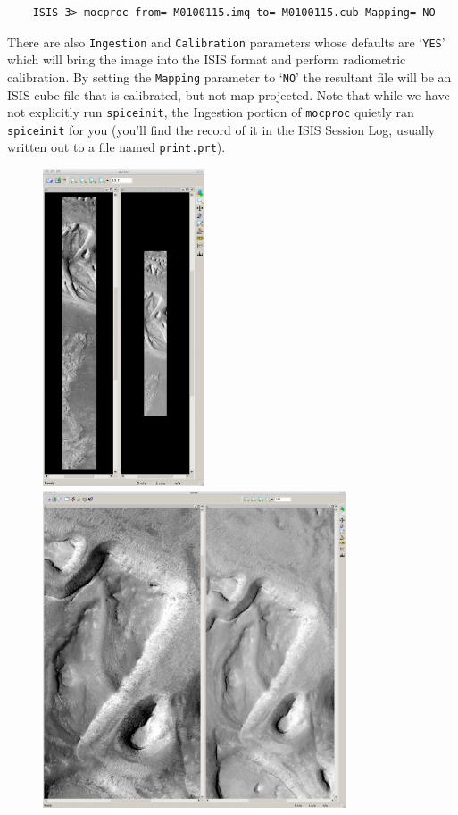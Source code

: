 \begin{verbatim}
    ISIS 3> mocproc from= M0100115.imq to= M0100115.cub Mapping= NO
\end{verbatim}
\noindent
There are also \texttt{Ingestion} and \texttt{Calibration} parameters
whose defaults are `\texttt{YES}' which will bring the image into
the ISIS format and perform radiometric calibration.  By setting
the \texttt{Mapping} parameter to `\texttt{NO}' the resultant file
will be an ISIS cube file that is calibrated, but not map-projected.
Note that while we have not explicitly run \texttt{spiceinit}, the
Ingestion portion of \texttt{mocproc} quietly ran \texttt{spiceinit}
for you (you'll find the record of it in the ISIS Session Log,
usually written out to a file named \texttt{print.prt}).

\begin{figure}[b!]
\begin{minipage}{5.2in}
\includegraphics[height=3.7in]{images/p19-images.png}
\hfill
\includegraphics[height=3.7in]{images/p19-images_zoom.png}

\end{minipage}
\end{figure}
